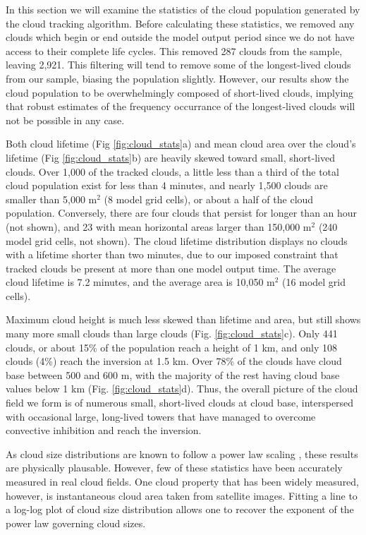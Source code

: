 \documentclass[acp]{copernicus}
\begin{document}
In this section we will examine the statistics of the cloud population 
generated by the cloud tracking algorithm.  Before calculating these 
statistics, we removed any clouds which begin or end outside the model output
period since we do not have access to their complete life cycles. This removed 
287 clouds from the sample, leaving 2,921.  This filtering will tend to remove 
some of the longest-lived clouds from our sample, biasing the population 
slightly.  However, our results show the cloud population to be overwhelmingly 
composed of short-lived clouds, implying that robust estimates of the frequency 
occurrance of the longest-lived clouds will not be possible in any case.

Both cloud lifetime (Fig \ref{fig:cloud_stats}a) and mean cloud area over the 
cloud's lifetime (Fig \ref{fig:cloud_stats}b) are heavily skewed toward small, 
short-lived clouds.  Over 1,000 of the tracked clouds, a little less than a 
third of the total cloud population exist for less than 4 minutes, and nearly 
1,500 clouds are smaller than 5,000 m$^2$ (8 model grid cells), or about a half 
of the cloud population.  Conversely, there are four clouds that persist for 
longer than an hour (not shown), and 23 with mean horizontal areas larger than 
150,000 m$^2$ (240 model grid cells, not shown).  The cloud lifetime 
distribution displays no clouds with a lifetime shorter than two minutes, due 
to our imposed constraint that tracked clouds be present at more than one model 
output time.  The average cloud lifetime is 7.2 minutes, and the average area 
is 10,050 m$^2$ (16 model grid cells).

Maximum cloud height is much less skewed than lifetime and area, but still 
shows many more small clouds than large clouds (Fig. \ref{fig:cloud_stats}c).
Only 441 clouds, or about 15\% of the population reach a height of 1 km, and 
only 108 clouds (4\%) reach the inversion at 1.5 km.  Over 78\% of the clouds 
have cloud base between 500 and 600 m, with the majority of the rest having 
cloud base values below 1 km (Fig. \ref{fig:cloud_stats}d).  Thus, the overall 
picture of the cloud field we form is of numerous small, short-lived clouds at 
cloud base, interspersed with occasional large, long-lived towers that have 
managed to overcome convective inhibition and reach the inversion.

As cloud size distributions are known to follow a power law scaling 
\cite{Zhao2007}, these results are physically plausable. However, few of these 
statistics have been accurately measured in real cloud fields. One cloud 
property that has been widely measured, however, is instantaneous cloud area 
taken from satellite images.  Fitting a line to a log-log plot of cloud size 
distribution allows one to recover the exponent of the power law governing 
cloud sizes. 
\end{document}
